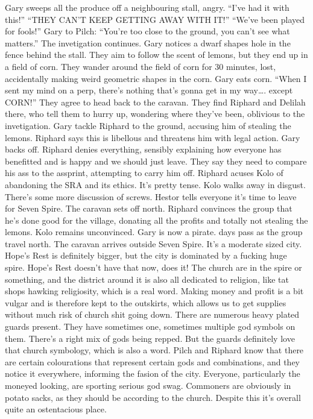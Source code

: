 Gary sweeps all the produce off a neighbouring stall, angry.\medskip
“I’ve had it with this!”\medskip
“THEY CAN’T KEEP GETTING AWAY WITH IT!”\medskip
“We’ve been played for fools!”\medskip
Gary to Pilch: “You’re too close to the ground, you can’t see what matters.”\medskip
The invetigation continues. Gary notices a dwarf shapes hole in the fence behind the stall. They aim to follow the scent of lemons, but they end up in a field of corn. They wander around the field of corn for 30 minutes, lost, accidentally making weird geometric shapes in the corn.\medskip
Gary eats corn.\medskip
“When I sent my mind on a perp, there’s nothing that’s gonna get in my way…. except CORN!”\medskip
They agree to head back to the caravan. They find Riphard and Delilah there, who tell them to hurry up, wondering where they’ve been, oblivious to the invetigation.\medskip
Gary tackle Riphard to the ground, accusing him of stealing the lemons. Riphard says this is libellous and threatens him with legal action. Gary backs off.\medskip
Riphard denies everything, sensibly explaining how everyone has benefitted and is happy and we should just leave. They say they need to compare his ass to the assprint, attempting to carry him off.\medskip
Riphard acuses Kolo of abandoning the SRA and its ethics. It’s pretty tense. Kolo walks away in disgust.\medskip
There’s some more discussion of screws.\medskip
Hestor tells everyone it’s time to leave for Seven Spire. The caravan sets off north. Riphard convinces the group that he’s done good for the village, donating all the profits and totally not stealing the lemons. Kolo remains unconvinced.\medskip
Gary is now a pirate. days pass as the group travel north.\medskip
The caravan arrives outside Seven Spire.\medskip
It’s a moderate sized city. Hope’s Rest is definitely bigger, but the city is dominated by a fucking huge spire. Hope’s Rest doesn’t have that now, does it!\medskip
The church are in the spire or something, and the district around it is also all dedicated to religion, like tat shops hawking religiosity, which is a real word. Making money and profit is a bit vulgar and is therefore kept to the outskirts, which allows us to get supplies without much risk of church shit going down.\medskip
There are numerous heavy plated guards present. They have sometimes one, sometimes multiple god symbols on them. There’s a right mix of gods being repped. But the guards definitely love that church symbology, which is also a word.\medskip
Pilch and Riphard know that there are certain colourations that represent certain gods and combinations, and they notice it everywhere, informing the fasion of the city. Everyone, particularly the moneyed looking, are sporting serious god swag. Commoners are obviously in potato sacks, as they should be according to the church. Despite this it’s overall quite an ostentacious place.\medskip

